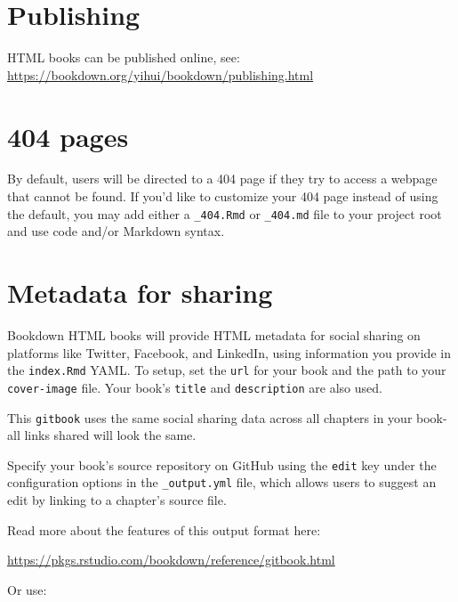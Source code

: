 \documentclass[
]{book}
\theoremstyle{definition}
\theoremstyle{definition}
\theoremstyle{definition}
\theoremstyle{definition}
\theoremstyle{remark}
\begin{document}
\hypertarget{publishing}{%
\section{Publishing}\label{publishing}}

HTML books can be published online, see: \url{https://bookdown.org/yihui/bookdown/publishing.html}

\hypertarget{pages}{%
\section{404 pages}\label{pages}}

By default, users will be directed to a 404 page if they try to access a webpage that cannot be found. If you'd like to customize your 404 page instead of using the default, you may add either a \texttt{\_404.Rmd} or \texttt{\_404.md} file to your project root and use code and/or Markdown syntax.

\hypertarget{metadata-for-sharing}{%
\section{Metadata for sharing}\label{metadata-for-sharing}}

Bookdown HTML books will provide HTML metadata for social sharing on platforms like Twitter, Facebook, and LinkedIn, using information you provide in the \texttt{index.Rmd} YAML. To setup, set the \texttt{url} for your book and the path to your \texttt{cover-image} file. Your book's \texttt{title} and \texttt{description} are also used.

This \texttt{gitbook} uses the same social sharing data across all chapters in your book- all links shared will look the same.

Specify your book's source repository on GitHub using the \texttt{edit} key under the configuration options in the \texttt{\_output.yml} file, which allows users to suggest an edit by linking to a chapter's source file.

Read more about the features of this output format here:

\url{https://pkgs.rstudio.com/bookdown/reference/gitbook.html}

Or use:
\end{document}
